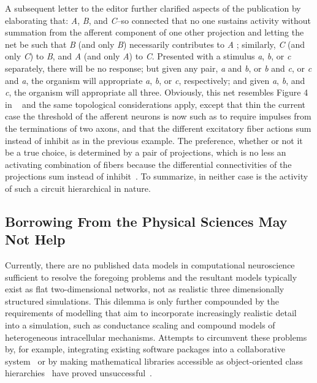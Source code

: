 \documentclass[11pt,3p,twocolumn]{JMN}
\begin{document}
A subsequent letter to the editor further clarified aspects of the publication by elaborating that: {\it{A}}, {\it{B}}, and {\it{C}}--so connected that no one sustains activity without summation from the afferent component of one other projection and letting the net be such that {\it{B}} (and only {\it{B}}) necessarily contributes to {\it{A}} ; similarly, {\it{C}} (and only {\it{C}}) to {\it{B}}, and {\it{A}} (and only {\it{A}}) to {\it{C}}. Presented with a stimulus {\it{a}}, {\it{b}}, or {\it{c}} separately, there will be no response; but given any pair, {\it{a}} and {\it{b}}, or {\it{b}} and {\it{c}}, or {\it{c}} and {\it{a}}, the organism will appropriate {\it{a}}, {\it{b}}, or {\it{c}}, respectively; and given {\it{a}}, {\it{b}}, and {\it{c}}, the organism will appropriate all three. Obviously, this net resembles Figure 4 in ~\citet{mcculloch45a} and the same topological considerations apply, except that thin the current case the threshold of the afferent neurons is now such as to require impulses from the terminations of two axons, and that the different excitatory fiber actions sum instead of inhibit as in the previous example. The preference, whether or not it be a true choice, is determined by a pair of projections, which is no less an activating combination of fibers because the differential connectivities of the projections sum instead of inhibit~\citep{mcculloch45b}. To summarize, in neither case is the activity of such a circuit hierarchical in nature.

\subsection{Borrowing From the Physical Sciences May Not Help}

Currently, there are no published data models in computational neuroscience sufficient to resolve the foregoing problems and the resultant models typically exist as flat two-dimensional networks, not as realistic three dimensionally structured simulations. This dilemma is only further compounded by the requirements of modelling that aim to incorporate increasingly realistic detail into a simulation, such as conductance scaling and compound models of heterogeneous intracellular mechanisms. Attempts to circumvent these problems by, for example, integrating existing software packages into a collaborative system~\citep{goddard01:_neosim} or by making mathematical libraries accessible as object-oriented class hierarchies~\citep{vibert01} have proved unsuccessful~\citep{cornelis03}.
\end{document}
